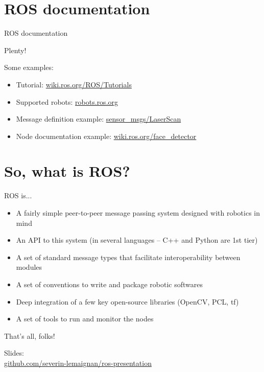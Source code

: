 \documentclass[compress]{beamer}
\begin{document}

\section[Doc]{ROS documentation}

\begin{frame}{ROS documentation}

Plenty!

Some examples:

\begin{itemize}
    \item Tutorial: \href{http://wiki.ros.org/ROS/Tutorials}{wiki.ros.org/ROS/Tutorials}
    \item Supported robots: \href{http://robots.ros.org/}{robots.ros.org}
    \item Message definition example:
        \href{http://docs.ros.org/api/sensor_msgs/html/msg/LaserScan.html}{sensor\_msgs/LaserScan}
    \item Node documentation example:
        \href{http://wiki.ros.org/face_detector}{wiki.ros.org/face\_detector}
\end{itemize}
\end{frame}

\section[So?]{So, what is ROS?}

\begin{frame}{ROS is...}
    \begin{itemize}
        \item<+-> A fairly simple peer-to-peer message passing system designed with robotics in
            mind
        \item<+-> An API to this system (in several languages -- C++ and Python are
            1st tier)
        \item<+-> A set of standard message types that facilitate interoperability between modules
        \item<+-> A set of conventions to write and package robotic softwares
        \item<+-> Deep integration of a few key open-source libraries (OpenCV, PCL, tf)
        \item<+-> A set of tools to run and monitor the nodes
    \end{itemize}
\end{frame}


\begin{frame}{}
    \begin{center}
        \Large
        That's all, folks!\\[2em]
    \end{center}
        \vspace{10em}

        Slides:\\ 
        \href{https://github.com/severin-lemaignan/ros-presentation}{\small github.com/severin-lemaignan/ros-presentation}

\end{frame}
\end{document}
